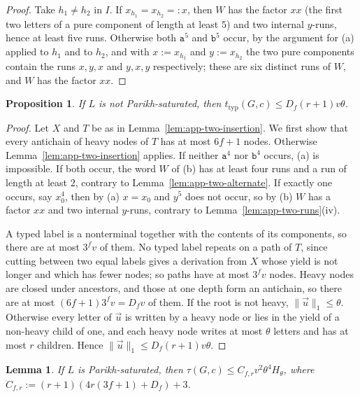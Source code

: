 \documentclass[11pt]{article}
\numberwithin{equation}{section}
\theoremstyle{plain}
\newtheorem{lemma}[theorem]{Lemma}
\newtheorem{proposition}[theorem]{Proposition}
\theoremstyle{definition}
\theoremstyle{remark}
\newcommand{\tuple}[1]{\vec{#1}}
\theoremstyle{plain}
\begin{document}
\begin{proof}
Take $h_1\ne h_2$ in $I$.  If $x_{h_1}=x_{h_2}=:x$, then $W$ has the factor $xx$
(the first two letters of a pure component of length at least $5$) and two
internal $y$-runs, hence at least five runs.  Otherwise both $\mathtt a^5$ and
$\mathtt b^5$ occur, by the argument for (a) applied to $h_1$ and to $h_2$, and with $x:=x_{h_1}$ and $y:=x_{h_2}$ the two pure
components contain the runs $x,y,x$ and $y,x,y$ respectively; these are six
distinct runs of $W$, and $W$ has the factor $xx$.
\end{proof}

\begin{proposition}\label{prop:app-two-nonsaturated}
If $L$ is not Parikh-saturated, then $t_{\mathrm{typ}}(G,c)\le D_f(r+1)v\theta$.
\end{proposition}

\begin{proof}
Let $X$ and $T$ be as in Lemma~\ref{lem:app-two-insertion}.  We first show that
every antichain of heavy nodes of $T$ has at most $6f+1$ nodes.  Otherwise
Lemma~\ref{lem:app-two-insertion} applies.  If neither $\mathtt a^4$ nor
$\mathtt b^4$ occurs, (a) is impossible.  If both occur, the word $W$ of (b)
has at least four runs and a run of length at least $2$, contrary to
Lemma~\ref{lem:app-two-alternate}.  If exactly one occurs, say $x_0^4$, then by
(a) $x=x_0$ and $y^5$ does not occur, so by (b) $W$ has a factor $xx$ and two
internal $y$-runs, contrary to Lemma~\ref{lem:app-two-runs}(iv).

A typed label is a nonterminal together with the contents of its components,
so there are at most $3^fv$ of them.  No typed label repeats on a path of $T$,
since cutting between two equal labels gives a derivation from $X$ whose yield
is not longer and which has fewer nodes; so paths have at most $3^fv$ nodes.
Heavy nodes are closed under ancestors, and those at one depth form an
antichain, so there are at most $(6f+1)3^fv=D_fv$ of them.  If the root is not
heavy, $\|\tuple u\|_1\le\theta$.  Otherwise every letter of $\tuple u$ is written by
a heavy node or lies in the yield of a non-heavy child of one, and each heavy
node writes at most $\theta$ letters and has at most $r$ children.  Hence
$\|\tuple u\|_1\le D_f(r+1)v\theta$.
\end{proof}

\begin{lemma}\label{lem:app-two-saturated}
If $L$ is Parikh-saturated, then
$\tau(G,c)\le C_{f,r}v^2\theta^4H_\theta$, where $C_{f,r}:=(r+1)(4r(3f+1)+D_f)+3$.
\end{lemma}
\end{document}

